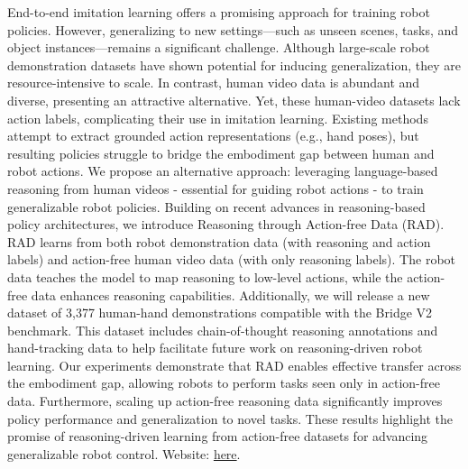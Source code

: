 End-to-end imitation learning offers a promising approach for training robot policies. However, generalizing to new settings—such as unseen scenes, tasks, and object instances—remains a significant challenge. Although large-scale robot demonstration datasets have shown potential for inducing generalization, they are resource-intensive to scale. In contrast, human video data is abundant and diverse, presenting an attractive alternative. Yet, these human-video datasets lack action labels, complicating their use in imitation learning. Existing methods attempt to extract grounded action representations (e.g., hand poses), but resulting policies struggle to bridge the embodiment gap between human and robot actions.
We propose an alternative approach: leveraging language-based reasoning from human videos - essential for guiding robot actions - to train generalizable robot policies. Building on recent advances in reasoning-based policy architectures, we introduce Reasoning through Action-free Data (RAD). RAD learns from both robot demonstration data (with reasoning and action labels) and action-free human video data (with only reasoning labels). The robot data teaches the model to map reasoning to low-level actions, while the action-free data enhances reasoning capabilities. Additionally, we will release a new dataset of 3,377 human-hand demonstrations compatible with the Bridge V2 benchmark. This dataset includes chain-of-thought reasoning annotations and hand-tracking data to help facilitate future work on reasoning-driven robot learning.
Our experiments demonstrate that RAD enables effective transfer across the embodiment gap, allowing robots to perform tasks seen only in action-free data. Furthermore, scaling up action-free reasoning data significantly improves policy performance and generalization to novel tasks. These results highlight the promise of reasoning-driven learning from action-free datasets for advancing generalizable robot control. 
Website: \href{https://rad-generalization.github.io}{here}.
